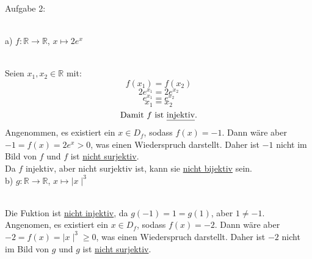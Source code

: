 \documentclass[11pt]{article}
\begin{document}
		\noindent \begin{Large}Aufgabe 2:\end{Large}\\[2pt]
			\indent a) $f: \mathbb{R} \rightarrow \mathbb{R}$, $x \mapsto 2e^x$\\
			\\
			Seien $x_1, x_2 \in \mathbb{R}$ mit:
				$$f(x_1)=f(x_2)$$
				$$2e^{x_1}=2e^{x_2}$$
				$$e^{x_1}=e^{x_2}$$
				$$x_1=x_2$$
				$$\mbox{Damit }f \mbox{ ist \underline{injektiv}.}$$
				Angenommen, es existiert ein $x \in D_f$, sodass $f(x)=-1$. Dann wäre aber $-1=f(x)=2e^x>0$, was einen Wiederspruch darstellt. Daher ist $-1$ nicht im Bild von $f$ und $f$ ist \underline{nicht surjektiv}.\\
				Da $f$ injektiv, aber nicht surjektiv ist, kann sie \underline{nicht bijektiv} sein.\\
			\indent b) $g: \mathbb{R} \rightarrow \mathbb{R}$, $x \mapsto \mid x \mid ^3$\\
				\\
				Die Fuktion ist \underline{nicht injektiv}, da $g(-1)=1=g(1)$, aber $1 \neq -1$.\\
				Angenomen, es existiert ein $x \in D_f$, sodass $f(x)=-2$. Dann wäre aber $-2=f(x)= \mid x \mid ^3 \geq 0$, was einen Wiederspruch darstellt. Daher ist $-2$ nicht im Bild von $g$ und $g$ ist \underline{nicht surjektiv}.\\
\end{document}
